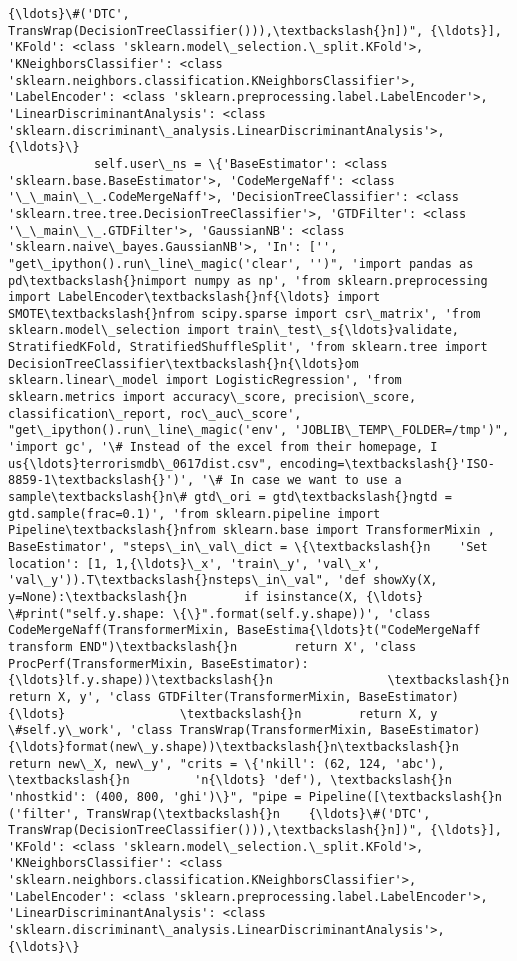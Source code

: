 \documentclass[11pt]{article}
\begin{document}
\begin{Verbatim}[commandchars=\\\{\}]
{\ldots}\#('DTC', TransWrap(DecisionTreeClassifier())),\textbackslash{}n])", {\ldots}], 'KFold': <class 'sklearn.model\_selection.\_split.KFold'>, 'KNeighborsClassifier': <class 'sklearn.neighbors.classification.KNeighborsClassifier'>, 'LabelEncoder': <class 'sklearn.preprocessing.label.LabelEncoder'>, 'LinearDiscriminantAnalysis': <class 'sklearn.discriminant\_analysis.LinearDiscriminantAnalysis'>, {\ldots}\}
            self.user\_ns = \{'BaseEstimator': <class 'sklearn.base.BaseEstimator'>, 'CodeMergeNaff': <class '\_\_main\_\_.CodeMergeNaff'>, 'DecisionTreeClassifier': <class 'sklearn.tree.tree.DecisionTreeClassifier'>, 'GTDFilter': <class '\_\_main\_\_.GTDFilter'>, 'GaussianNB': <class 'sklearn.naive\_bayes.GaussianNB'>, 'In': ['', "get\_ipython().run\_line\_magic('clear', '')", 'import pandas as pd\textbackslash{}nimport numpy as np', 'from sklearn.preprocessing import LabelEncoder\textbackslash{}nf{\ldots} import SMOTE\textbackslash{}nfrom scipy.sparse import csr\_matrix', 'from sklearn.model\_selection import train\_test\_s{\ldots}validate, StratifiedKFold, StratifiedShuffleSplit', 'from sklearn.tree import DecisionTreeClassifier\textbackslash{}n{\ldots}om sklearn.linear\_model import LogisticRegression', 'from sklearn.metrics import accuracy\_score, precision\_score, classification\_report, roc\_auc\_score', "get\_ipython().run\_line\_magic('env', 'JOBLIB\_TEMP\_FOLDER=/tmp')", 'import gc', '\# Instead of the excel from their homepage, I us{\ldots}terrorismdb\_0617dist.csv", encoding=\textbackslash{}'ISO-8859-1\textbackslash{}')', '\# In case we want to use a sample\textbackslash{}n\# gtd\_ori = gtd\textbackslash{}ngtd = gtd.sample(frac=0.1)', 'from sklearn.pipeline import Pipeline\textbackslash{}nfrom sklearn.base import TransformerMixin , BaseEstimator', "steps\_in\_val\_dict = \{\textbackslash{}n    'Set location': [1, 1,{\ldots}\_x', 'train\_y', 'val\_x', 'val\_y')).T\textbackslash{}nsteps\_in\_val", 'def showXy(X, y=None):\textbackslash{}n        if isinstance(X, {\ldots}  \#print("self.y.shape: \{\}".format(self.y.shape))', 'class CodeMergeNaff(TransformerMixin, BaseEstima{\ldots}t("CodeMergeNaff transform END")\textbackslash{}n        return X', 'class ProcPerf(TransformerMixin, BaseEstimator):{\ldots}lf.y.shape))\textbackslash{}n                \textbackslash{}n        return X, y', 'class GTDFilter(TransformerMixin, BaseEstimator){\ldots}                \textbackslash{}n        return X, y \#self.y\_work', 'class TransWrap(TransformerMixin, BaseEstimator){\ldots}format(new\_y.shape))\textbackslash{}n\textbackslash{}n        return new\_X, new\_y', "crits = \{'nkill': (62, 124, 'abc'), \textbackslash{}n         'n{\ldots} 'def'), \textbackslash{}n         'nhostkid': (400, 800, 'ghi')\}", "pipe = Pipeline([\textbackslash{}n    ('filter', TransWrap(\textbackslash{}n    {\ldots}\#('DTC', TransWrap(DecisionTreeClassifier())),\textbackslash{}n])", {\ldots}], 'KFold': <class 'sklearn.model\_selection.\_split.KFold'>, 'KNeighborsClassifier': <class 'sklearn.neighbors.classification.KNeighborsClassifier'>, 'LabelEncoder': <class 'sklearn.preprocessing.label.LabelEncoder'>, 'LinearDiscriminantAnalysis': <class 'sklearn.discriminant\_analysis.LinearDiscriminantAnalysis'>, {\ldots}\}

\end{Verbatim}
\end{document}
